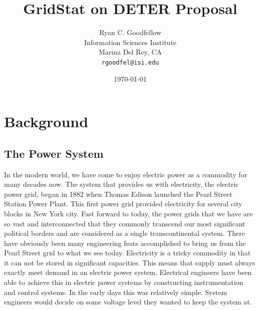 \documentclass{article}
\begin{document}
\title{GridStat on DETER Proposal}

\author{Ryan C. Goodfellow \\
	Information Sciences Institute \\
	Marina Del Rey, CA \\
	\texttt{rgoodfel@isi.edu}}

\date{\today}

\newtheorem{thm}{Theorem}[section]
\newtheorem{cor}[thm]{Corollary}
\newtheorem{lem}[thm]{Lemma}

\theoremstyle{remark}
\newtheorem{rem}[thm]{Remark}

\theoremstyle{definition}
\newtheorem{defn}[thm]{Definition}
\newtheorem{exmp}[thm]{Example}
\newtheorem{prop}[thm]{Proposition}

\theoremstyle{axiom}
\newtheorem*{axiom}{Theorem}


\maketitle

\section{Background}

\subsection{The Power System}
In the modern world, we have come to enjoy electric power as a commodity for many 
decades now.  The system that provides us with electricity, the electric power grid, 
began in 1882 when Thomas Edison launched the Pearl Street Station Power Plant. This 
first power grid provided electricity for several city blocks in New York city.  Fast 
forward to today, the power grids that we have are so vast and interconnected that they 
commonly transcend our most significant political borders and are considered as a single 
transcontinental system.  There have obviously been many engineering feats accomplished 
to bring us from the Pearl Street grid to what we see today.  Electricity is a tricky 
commodity in that it can not be stored in significant capacities.  This means that 
supply must always exactly meet demand in an electric power system.  Electrical 
engineers have been able to achieve this in electric power systems by constructing 
instrumentation and control systems.  In the early days this was relatively simple.  
System engineers would decide on some voltage level they wanted to keep the system at.  
\end{document}
